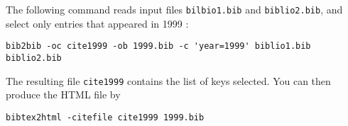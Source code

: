 \documentclass[11pt,a4paper]{article}
\begin{document}
The following command reads input files \verb|bilbio1.bib| and
\verb|biblio2.bib|, and select only entries that appeared in 1999 :
\begin{verbatim}
bib2bib -oc cite1999 -ob 1999.bib -c 'year=1999' biblio1.bib
biblio2.bib 
\end{verbatim}
The resulting file \verb|cite1999| contains the list of keys
selected. You can then produce the HTML file by
\begin{verbatim}
bibtex2html -citefile cite1999 1999.bib
\end{verbatim}


\end{document}
